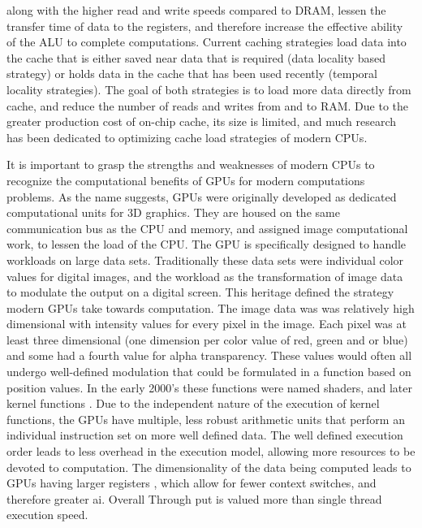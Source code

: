 along with the higher read and write speeds compared to \Gls{DRAM}, lessen the transfer
time of data to the registers, and therefore increase the effective ability of the
 \Gls{ALU} to complete computations. Current caching strategies load data into
 the cache that is either saved near data that is required (data locality based strategy)
 or holds data in the cache that has been used recently (temporal locality strategies).
 The goal of both strategies is to load more data directly from cache, and reduce
 the number of reads and writes from and to \gls{RAM}.
Due to the greater production cost of on-chip cache, its size is limited, and
much research has been dedicated to optimizing cache load strategies of modern CPUs.
\par

It is important to grasp the strengths and weaknesses of modern \Glspl{CPU} to
recognize the computational benefits of \Glspl{GPU}
for modern computations problems.  As the name suggests, \Glspl{GPU} were originally developed
as dedicated computational units for 3D graphics\cite{Sanders}.  They are housed on the same
communication bus as the \Gls{CPU} and memory, and assigned image computational work,
to lessen the load of the \Gls{CPU}.
The GPU is specifically designed to handle workloads on large data sets. Traditionally these
data sets were individual color values for digital images, and the workload as
the transformation of image data to modulate the output on a digital screen.
This heritage defined the strategy modern GPUs take towards computation.
The image data was was relatively high dimensional with intensity values for every pixel in the image.
Each pixel was at least three dimensional (one dimension per color value of red, green and or blue) and
some had a fourth value for alpha transparency. These values would often all undergo
well-defined modulation that could be formulated in a function based on position values.
In the early 2000's these functions were named shaders, and later kernel functions \cite{5751939}.
Due to the independent nature of the execution of kernel functions, the GPUs have multiple, less robust
arithmetic units that perform an individual instruction set on more well defined data.
The well defined execution order leads to less overhead in the execution
model, allowing more resources to be devoted to computation.
The dimensionality of the data being computed leads to \Glspl{GPU} having larger registers \cite{5751939},
which allow for fewer context switches, and therefore greater \gls{ai}.  Overall
Through put is valued more than single thread execution speed.  %

